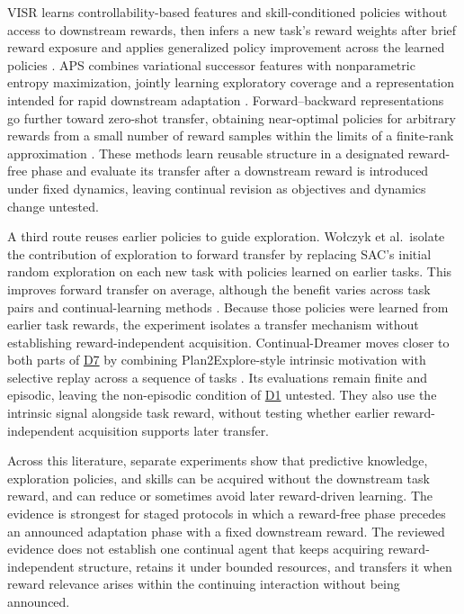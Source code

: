 \documentclass[10pt,journal,compsoc]{IEEEtran}
\DeclareRobustCommand{\Dref}[1]{\hyperref[sec:d#1]{D#1}}
\begin{document}
VISR learns controllability-based features and skill-conditioned policies without access to downstream rewards, then infers a new task's reward weights after brief reward exposure and applies generalized policy improvement across the learned policies \cite{hansen2020}.
APS combines variational successor features with nonparametric entropy maximization, jointly learning exploratory coverage and a representation intended for rapid downstream adaptation \cite{liu2021}.
Forward--backward representations go further toward zero-shot transfer, obtaining near-optimal policies for arbitrary rewards from a small number of reward samples within the limits of a finite-rank approximation \cite{touati2021}.
These methods learn reusable structure in a designated reward-free phase and evaluate its transfer after a downstream reward is introduced under fixed dynamics, leaving continual revision as objectives and dynamics change untested.

A third route reuses earlier policies to guide exploration.
Wo{\l}czyk et al.\ isolate the contribution of exploration to forward transfer by replacing SAC's initial random exploration on each new task with policies learned on earlier tasks.
This improves forward transfer on average, although the benefit varies across task pairs and continual-learning methods \cite{wolczyk2022}.
Because those policies were learned from earlier task rewards, the experiment isolates a transfer mechanism without establishing reward-independent acquisition.
Continual-Dreamer moves closer to both parts of \Dref{7} by combining Plan2Explore-style intrinsic motivation with selective replay across a sequence of tasks \cite{kessler2023}.
Its evaluations remain finite and episodic, leaving the non-episodic condition of \Dref{1} untested.
They also use the intrinsic signal alongside task reward, without testing whether earlier reward-independent acquisition supports later transfer.

Across this literature, separate experiments show that predictive knowledge, exploration policies, and skills can be acquired without the downstream task reward, and can reduce or sometimes avoid later reward-driven learning.
The evidence is strongest for staged protocols in which a reward-free phase precedes an announced adaptation phase with a fixed downstream reward.
The reviewed evidence does not establish one continual agent that keeps acquiring reward-independent structure, retains it under bounded resources, and transfers it when reward relevance arises within the continuing interaction without being announced.
\end{document}
